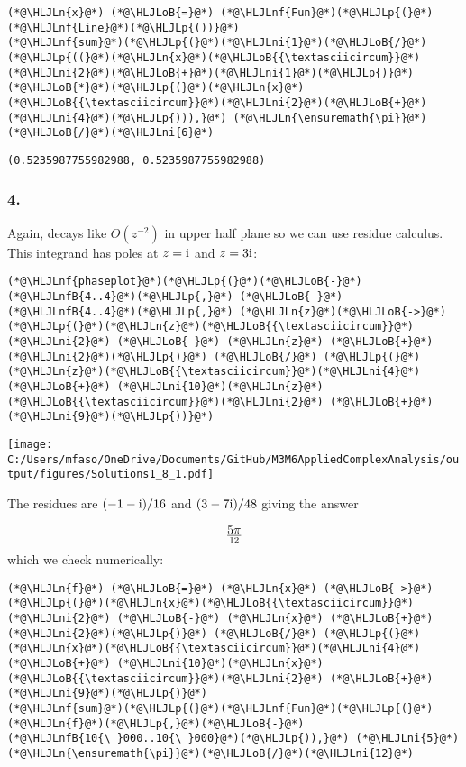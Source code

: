 \documentclass[12pt,landscape]{article}
\newcommand{\HLJLn}[1]{#1}
\newcommand{\HLJLnf}[1]{\textcolor[RGB]{66,102,213}{#1}}
\newcommand{\HLJLnfB}[1]{\textcolor[RGB]{59,151,46}{#1}}
\newcommand{\HLJLni}[1]{\textcolor[RGB]{59,151,46}{#1}}
\newcommand{\HLJLoB}[1]{\textcolor[RGB]{102,102,102}{\textbf{#1}}}
\newcommand{\HLJLp}[1]{#1}
\def\I{ {\rm i} }
\def\cent#1{\begin{center}#1\end{center} }
\begin{document}
{\begin{lstlisting}
(*@\HLJLn{x}@*) (*@\HLJLoB{=}@*) (*@\HLJLnf{Fun}@*)(*@\HLJLp{(}@*) (*@\HLJLnf{Line}@*)(*@\HLJLp{())}@*)
(*@\HLJLnf{sum}@*)(*@\HLJLp{(}@*)(*@\HLJLni{1}@*)(*@\HLJLoB{/}@*)(*@\HLJLp{((}@*)(*@\HLJLn{x}@*)(*@\HLJLoB{{\textasciicircum}}@*)(*@\HLJLni{2}@*)(*@\HLJLoB{+}@*)(*@\HLJLni{1}@*)(*@\HLJLp{)}@*)(*@\HLJLoB{*}@*)(*@\HLJLp{(}@*)(*@\HLJLn{x}@*)(*@\HLJLoB{{\textasciicircum}}@*)(*@\HLJLni{2}@*)(*@\HLJLoB{+}@*)(*@\HLJLni{4}@*)(*@\HLJLp{))),}@*) (*@\HLJLn{\ensuremath{\pi}}@*)(*@\HLJLoB{/}@*)(*@\HLJLni{6}@*)
\end{lstlisting}

\begin{lstlisting}
(0.5235987755982988, 0.5235987755982988)
\end{lstlisting}

\newpage
\subsubsection{4.}
Again, decays like $O(z^{-2})$ in upper half plane so we can use residue calculus. This integrand has poles at $z = \I$ and $z = 3 \I$:


\begin{lstlisting}
(*@\HLJLnf{phaseplot}@*)(*@\HLJLp{(}@*)(*@\HLJLoB{-}@*)(*@\HLJLnfB{4..4}@*)(*@\HLJLp{,}@*) (*@\HLJLoB{-}@*)(*@\HLJLnfB{4..4}@*)(*@\HLJLp{,}@*) (*@\HLJLn{z}@*)(*@\HLJLoB{->}@*) (*@\HLJLp{(}@*)(*@\HLJLn{z}@*)(*@\HLJLoB{{\textasciicircum}}@*)(*@\HLJLni{2}@*) (*@\HLJLoB{-}@*) (*@\HLJLn{z}@*) (*@\HLJLoB{+}@*) (*@\HLJLni{2}@*)(*@\HLJLp{)}@*) (*@\HLJLoB{/}@*) (*@\HLJLp{(}@*)(*@\HLJLn{z}@*)(*@\HLJLoB{{\textasciicircum}}@*)(*@\HLJLni{4}@*) (*@\HLJLoB{+}@*) (*@\HLJLni{10}@*)(*@\HLJLn{z}@*)(*@\HLJLoB{{\textasciicircum}}@*)(*@\HLJLni{2}@*) (*@\HLJLoB{+}@*)(*@\HLJLni{9}@*)(*@\HLJLp{))}@*)
\end{lstlisting}

\cent{\texttt{[image: C:/Users/mfaso/OneDrive/Documents/GitHub/M3M6AppliedComplexAnalysis/output/figures/Solutions1\_8\_1.pdf]}}

The residues are $(-1-\I)/16$ and $(3-7\I)/48$ giving the answer

\[
5\pi \over 12
\]
which we check numerically:


\begin{lstlisting}
(*@\HLJLn{f}@*) (*@\HLJLoB{=}@*) (*@\HLJLn{x}@*) (*@\HLJLoB{->}@*) (*@\HLJLp{(}@*)(*@\HLJLn{x}@*)(*@\HLJLoB{{\textasciicircum}}@*)(*@\HLJLni{2}@*) (*@\HLJLoB{-}@*) (*@\HLJLn{x}@*) (*@\HLJLoB{+}@*) (*@\HLJLni{2}@*)(*@\HLJLp{)}@*) (*@\HLJLoB{/}@*) (*@\HLJLp{(}@*)(*@\HLJLn{x}@*)(*@\HLJLoB{{\textasciicircum}}@*)(*@\HLJLni{4}@*) (*@\HLJLoB{+}@*) (*@\HLJLni{10}@*)(*@\HLJLn{x}@*)(*@\HLJLoB{{\textasciicircum}}@*)(*@\HLJLni{2}@*) (*@\HLJLoB{+}@*)(*@\HLJLni{9}@*)(*@\HLJLp{)}@*)
(*@\HLJLnf{sum}@*)(*@\HLJLp{(}@*)(*@\HLJLnf{Fun}@*)(*@\HLJLp{(}@*)(*@\HLJLn{f}@*)(*@\HLJLp{,}@*)(*@\HLJLoB{-}@*)(*@\HLJLnfB{10{\_}000..10{\_}000}@*)(*@\HLJLp{)),}@*) (*@\HLJLni{5}@*)(*@\HLJLn{\ensuremath{\pi}}@*)(*@\HLJLoB{/}@*)(*@\HLJLni{12}@*)
\end{lstlisting}

}
\end{document}
